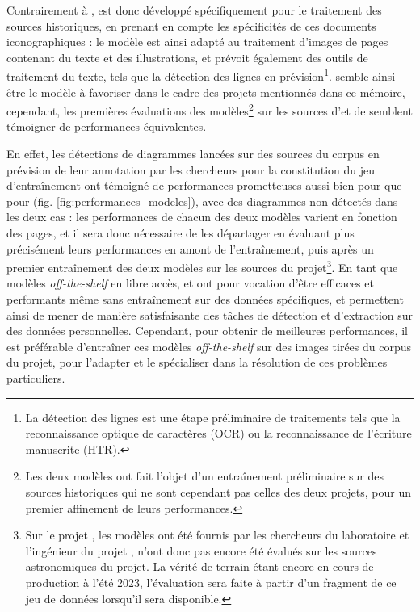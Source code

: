    	Contrairement à \yolov, \docex est donc développé spécifiquement pour le traitement des sources historiques, en prenant en compte les spécificités de ces documents iconographiques : le modèle est ainsi adapté au traitement d'images de pages contenant du texte et des illustrations, et prévoit également des outils de traitement du texte, tels que la détection des lignes en prévision\footnote{La détection des lignes est une étape préliminaire de traitements tels que la reconnaissance optique de caractères (OCR) ou la reconnaissance de l'écriture manuscrite (HTR).}. \docex semble ainsi être le modèle à favoriser dans le cadre des projets mentionnés dans ce mémoire, cependant, les premières évaluations des modèles\footnote{Les deux modèles ont fait l'objet d'un entraînement préliminaire sur des sources historiques qui ne sont cependant pas celles des deux projets, pour un premier affinement de leurs performances.} sur les sources d'\eida et de \vhs semblent témoigner de performances équivalentes.
   	
   	En effet, les détections de diagrammes lancées sur des sources du corpus \eida en prévision de leur annotation par les chercheurs pour la constitution du jeu d'entraînement ont témoigné de performances prometteuses aussi bien pour \docex que pour \yolov  (fig. \ref{fig:performances_modeles}), avec des diagrammes non-détectés dans les deux cas : les performances de chacun des deux modèles varient en fonction des pages, et il sera donc nécessaire de les départager en évaluant plus précisément leurs performances en amont de l'entraînement, puis après un premier entraînement des deux modèles sur les sources du projet\footnote{Sur le projet \eida, les modèles ont été fournis par les chercheurs du laboratoire \imagine et l'ingénieur du projet \vhs, n'ont donc pas encore été évalués sur les sources astronomiques du projet. La vérité de terrain étant encore en cours de production à l'été 2023, l'évaluation sera faite à partir d'un fragment de ce jeu de données lorsqu'il sera disponible.}. En tant que modèles \textit{off-the-shelf} en libre accès, \yolov et \docex ont pour vocation d'être efficaces et performants même sans entraînement sur des données spécifiques, et permettent ainsi de mener de manière satisfaisante des tâches de détection et d'extraction sur des données personnelles. Cependant, pour obtenir de meilleures performances, il est préférable d'entraîner ces modèles \textit{off-the-shelf} sur des images tirées du corpus du projet, pour l'adapter et le spécialiser dans la résolution de ces problèmes particuliers.
   	

